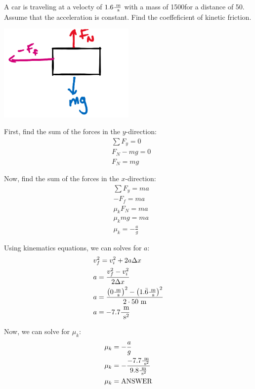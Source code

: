 \begin{problem}
	A car is traveling at a velocty of $1.6 \frac{\text{ m}}{\text{ s}}$ with a mass of 1500\kg \text{ }for a distance of 50\m. Assume that the acceleration is constant. Find the coeffeficient of kinetic friction. \\

	\begin{center}
		\includegraphics[width=0.5\textwidth]{chapters/ch3/images/fig3_8.PNG}
	\end{center}

	First, find the sum of the forces in the $y$-direction:
	$$
	\begin{aligned}
		&\sum F_y = 0\\
		&F_N - mg = 0\\
		&F_N = mg
	\end{aligned}
	$$

	Now, find the sum of the forces in the $x$-direction:
	$$
	\begin{aligned}
		&\sum F_y = ma\\
		&-F_f = ma\\
		&\mu_k F_N = ma\\
		&\mu_k mg = ma\\
		&\mu_k = -\frac{a}{g}
	\end{aligned}
	$$

	Using kinematics equations, we can solves for $a$:
	$$
	\begin{aligned}
		&v_f^2 = v_i^2 + 2a\Delta x\\
		&a = \frac{v_f^2-v_i^2}{2 \Delta x}\\
		&a = \frac{\left(0\frac{\text{ m}}{\text{ s}}\right)^2 - \left(1.\bar{6} \frac{\text{ m}}{\text{ s}}\right)^2}{2 \cdot 50 \text{ m}}\\
		&a = -7.7 \frac{\text{ m}}{\text{ s}^2}
	\end{aligned}
	$$

	Now, we can solve for $\mu_k$:
	$$
	\begin{aligned}
		&\mu_k = -\frac{a}{g}\\
		&\mu_k = -\frac{-7.7 \frac{\text{ m}}{\text{ s}^2}}{9.8 \frac{\text{ m}}{\text{ s}^2}}\\
		&\mu_k = \text{ANSWER}
	\end{aligned}
	$$
\end{problem}



